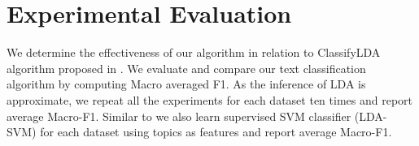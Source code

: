 \documentclass[11pt]{article}
\newcommand{\superscript}[1]{\ensuremath{^{\textrm{#1}}}}
\def\wg{\superscript{2}}
\begin{document}
\section{Experimental Evaluation} \label{sec:Experiments}
We determine the effectiveness of our algorithm in relation to ClassifyLDA algorithm proposed in \cite{Hingmire:2013:DCT:2484028.2484140}.  We evaluate and compare our text classification algorithm by computing Macro averaged F1. As the inference of LDA is approximate, we repeat all the experiments for each dataset ten times and report average Macro-F1. Similar to \cite{Blei:Latent} we also learn supervised SVM classifier (LDA-SVM) for each dataset using topics as features and report average Macro-F1.

\end{document}
